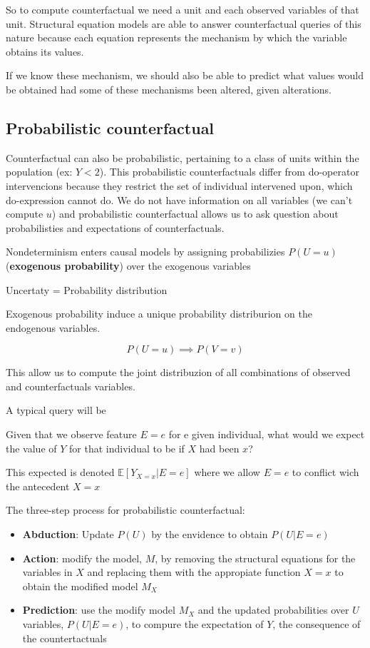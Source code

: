 So to compute counterfactual we need a unit and each observed variables of that unit.
Structural equation models are able to answer counterfactual queries of this nature because 
each equation represents the mechanism by which the variable obtains its values.

If we know these mechanism, we should also be able to predict what values would be 
obtained had some of these mechanisms been altered, given alterations.

\subsection{Probabilistic counterfactual}
Counterfactual can also be probabilistic, pertaining to a class of units within the population (ex: $Y<2$). 
This probabilistic counterfactuals differ from do-operator intervencions because 
they restrict the set of individual intervened upon, which do-expression cannot do. 
We do not have information on all variables (we can't compute $u$) and probabilistic counterfactual allows 
us to ask question about probabilisties and expectations of counterfactuals.

Nondeterminism enters causal models by assigning probabilizies $P(U=u)$ (\textbf{exogenous probability}) over the 
exogenous variables 
\begin{center}
    Uncertaty = Probability distribution
\end{center}

Exogenous probability induce a unique probability distriburion on the endogenous 
variables.

$$P(U=u) \implies P(V=v)$$

This allow us to compute the joint distribuzion of all combinations of 
observed and counterfactuals variables. 

A typical query will be 
\begin{center}
    Given that we observe feature $E=e$ for e given individual, what would we 
    expect the value of $Y$ for that individual to be if $X$ had been $x$?
\end{center}

This expected is denoted $\mathbb{E}[Y_{X=x}|E=e]$
where we allow $E=e$ to conflict wich the antecedent $X=x$ 

The three-step process for probabilistic counterfactual:
\begin{itemize}
    \item \textbf{Abduction}: Update $P(U)$ by the envidence to obtain $P(U |E=e)$
    \item \textbf{Action}: modify the model, $M$, by removing the structural equations for 
    the variables in $X$ and replacing them with the appropiate function $X=x$ to 
    obtain the modified model $M_X$
    \item \textbf{Prediction}: use the modify model $M_X$ and the updated probabilities 
    over $U$ variables, $P(U|E=e)$, to compure the expectation of $Y$, the consequence 
    of the countertactuals
\end{itemize}
